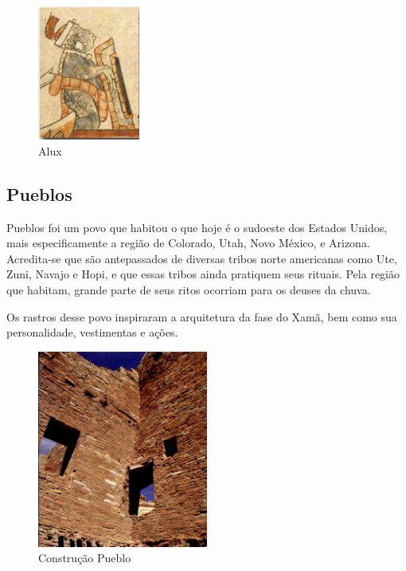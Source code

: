 \begin{figure}[!htb] \caption{\label{fig_alux}Alux} \begin{center}
\includegraphics[width=0.3\textwidth]{imagens/alux.jpg} \end{center}
 \end{figure}

\clearpage

\subsection{Pueblos}

Pueblos foi  um povo que habitou o que hoje é o sudoeste dos Estados Unidos, mais especificamente a região de Colorado, Utah, Novo México, e Arizona.\cite{civPerdidas2017,lyneis1995virgin} Acredita-se que são antepassados de diversas tribos norte americanas como Ute, Zuni, Navajo e Hopi, e que essas tribos ainda pratiquem seus rituais. Pela região que habitam, grande parte de seus ritos ocorriam para os deuses da chuva\cite{abreu94}.

Os rastros desse povo inspiraram a arquitetura da fase do Xamã, bem como sua personalidade, vestimentas e ações.

\begin{figure}[!htb] \caption{\label{fig_puebloan}Construção Pueblo} \begin{center}
\includegraphics[width=0.5\textwidth]{imagens/puebloans.png} \end{center}
 \end{figure}



